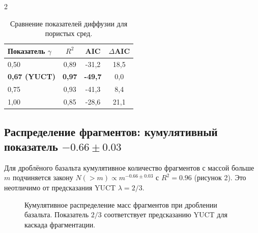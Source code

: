 \documentclass[11pt,a4paper]{article}
\begin{document}
\begin{multicols}{2}
		\begin{table}[htbp]
			\centering
			\caption{Сравнение показателей диффузии для пористых сред.}
			\label{tab:diffusion}
			\begin{tabular}{lccc}
				\toprule
				Показатель $\gamma$ & $R^2$ & AIC & $\Delta$AIC \\
				\midrule
				0,50 & 0,89 & -31,2 & 18,5 \\
				\textbf{0,67 (YUCT)} & \textbf{0,97} & \textbf{-49,7} & 0,0 \\
				0,75 & 0,93 & -41,3 & 8,4 \\
				1,00 & 0,85 & -28,6 & 21,1 \\
				\bottomrule
			\end{tabular}
		\end{table}
		
		\subsection{Распределение фрагментов: кумулятивный показатель \(-0.66 \pm 0.03\)}
		
		Для дроблёного базальта кумулятивное количество фрагментов с массой больше \(m\) подчиняется закону \(N(>m) \propto m^{-0.66 \pm 0.03}\) с \(R^2 = 0.96\) (рисунок 2). Это неотличимо от предсказания YUCT \(\lambda = 2/3\).
		
		\begin{figure}[htbp]
			\centering
			\caption{Кумулятивное распределение масс фрагментов при дроблении базальта. Показатель \(2/3\) соответствует предсказанию YUCT для каскада фрагментации.}
			\label{fig:fragmentation}
		\end{figure}
		

\end{multicols}
\end{document}
